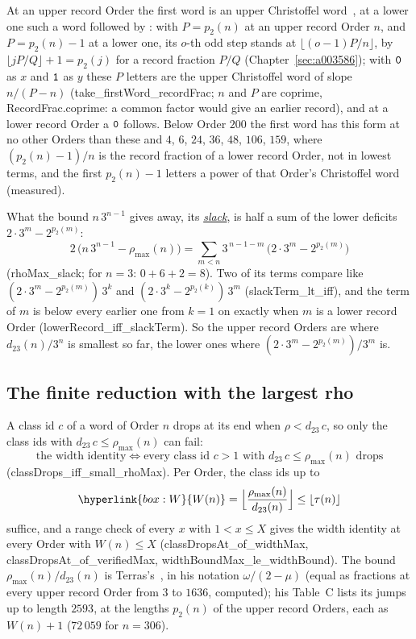 \documentclass[10pt,a4paper,titlepage]{article}
\makeatletter
\newcommand{\termhere}[1]{\leavevmode
  \Hy@raisedlink{\hyper@anchorstart{term:#1}\hyper@anchorend}}
\newcommand{\keyterm}[2]{\hyperlink{box:#1}{\emph{#2}}}
\newcommand{\keysym}[2]{\hyperlink{box:#1}{#2}}
\newcommand{\lean}[1]{\textsf{#1}}
\makeatother
\begin{document}
At an upper record Order the first word is an upper Christoffel word~\cite[Definition~1.1]{BerstelLRS2008}, at a lower one such a word followed by :
with $P = p_2(n)$ at an upper record Order $n$, and $P = p_2(n) - 1$ at a lower one, its $o$-th
odd step stands at $\lfloor (o-1)P/n \rfloor$, by $\lfloor jP/Q \rfloor + 1 = p_2(j)$ for a
record fraction $P/Q$ (Chapter~\ref{sec:a003586}); with $\text{\texttt{0}}$ as $x$ and $\text{\texttt{1}}$ as $y$
these $P$ letters are the upper Christoffel word of slope $n/(P - n)$
(\lean{take\_firstWord\_recordFrac}; $n$ and $P$ are coprime, \lean{RecordFrac.coprime}:
a common factor would give an earlier record), and at a lower record Order a $\text{\texttt{0}}$ follows.
Below Order $200$ the first word has this form at no other Orders than these and $4$, $6$,
$24$, $36$, $48$, $106$, $159$, where $(p_2(n) - 1)/n$ is the record fraction of a lower record
Order, not in lowest terms, and the first $p_2(n) - 1$ letters a power of that Order's
Christoffel word (measured).

\termhere{slack}What the bound $n\,3^{n-1}$ gives away, its \keyterm{slack}{slack}, is half a sum of the lower deficits
$2 \cdot 3^m - 2^{p_2(m)}$:
\[
2\,\bigl(n\,3^{n-1} - \rho_{\max}(n)\bigr) = \sum_{m < n} 3^{\,n-1-m}\,
  \bigl(2 \cdot 3^m - 2^{p_2(m)}\bigr)
\]
(\lean{rhoMax\_slack}; for $n = 3$: $0 + 6 + 2 = 8$). Two of its terms compare like
$(2 \cdot 3^m - 2^{p_2(m)})\,3^k$ and $(2 \cdot 3^k - 2^{p_2(k)})\,3^m$
(\lean{slackTerm\_lt\_iff}), and the term of $m$ is below every earlier one from $k = 1$ on
exactly when $m$ is a lower record Order (\lean{lowerRecord\_iff\_slackTerm}). So the upper
record Orders are where $d_{23}(n)/3^n$ is smallest so far, the lower ones where
$(2 \cdot 3^m - 2^{p_2(m)})/3^m$ is.

\subsection*{The finite reduction with the largest rho}

A class id $c$ of a word of Order $n$ drops at its end when $\rho < d_{23}\,c$, so only the
class ids with $d_{23}\,c \le \rho_{\max}(n)$ can fail:
\[
\text{the width identity} \iff
  \text{every class id } c > 1 \text{ with } d_{23}\,c \le \rho_{\max}(n) \text{ drops}
\]
(\lean{classDrops\_iff\_small\_rhoMax}). \termhere{W}Per Order, the class ids up to
\[
\keysym{W}{W(n)} = \Bigl\lfloor \frac{\rho_{\max}(n)}{d_{23}(n)} \Bigr\rfloor \le \lfloor \tau(n) \rfloor
\]
suffice, and a range check of every $x$ with $1 < x \le X$ gives the width identity at every
Order with $W(n) \le X$ (\lean{classDropsAt\_of\_widthMax},
\lean{classDropsAt\_of\_verifiedMax}, \lean{widthBoundMax\_le\_widthBound}). The bound
$\rho_{\max}(n)/d_{23}(n)$ is Terras's~\cite[Cor.~2.8, Thm.~2.10]{Terras1976}, in his notation
$\omega/(2 - \mu)$ (equal as fractions at every upper record Order from $3$ to $1636$, computed); his
Table~C lists its jumps up to length $2593$, at the lengths $p_2(n)$ of the upper record
Orders, each as $W(n) + 1$ ($72\,059$ for $n = 306$).
\end{document}
